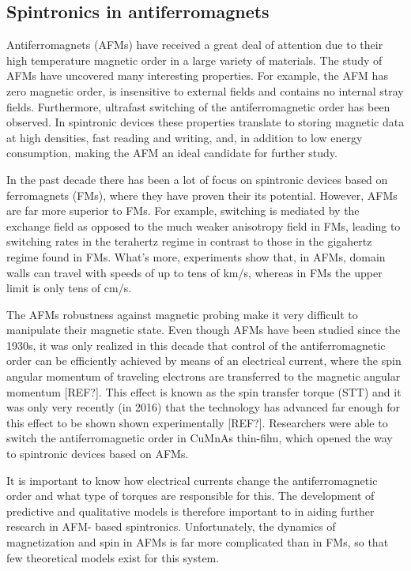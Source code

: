 \subsection{Spintronics in antiferromagnets}
Antiferromagnets (AFMs) have received a great deal of attention due to their high temperature magnetic order in a large variety of materials. The study of
AFMs have uncovered many interesting properties. For example, the AFM has zero magnetic order, is
insensitive to external fields and contains no internal stray fields.
Furthermore, ultrafast switching of the antiferromagnetic order has been observed. In
spintronic devices these properties translate to storing magnetic data at high densities, fast
reading and writing, and, in addition to low energy consumption, making the AFM an ideal
candidate for further study.

In the past decade there has been a lot of focus on spintronic devices based on
ferromagnets (FMs), where they have proven their its potential. However,
AFMs are far more superior to FMs. For example, switching is mediated by the
exchange field as opposed to the much weaker anisotropy field in FMs, leading to
switching rates in the terahertz regime in contrast to those in the gigahertz regime found in
FMs. What’s more, experiments show that, in
AFMs, domain walls can travel with speeds of up to tens of km/s, whereas in FMs
the upper limit is only tens of cm/s.

The AFMs robustness against magnetic probing make it very difficult to manipulate their
magnetic state. Even though AFMs have been studied since the 1930s, it was only
realized in this decade that control of the antiferromagnetic order can be efficiently 
achieved by means of an electrical current, where the spin angular momentum of traveling
electrons are transferred to the magnetic angular momentum [REF?]. This effect is
known as the spin transfer torque (STT) and it was only very recently (in 2016) that the
technology has advanced far enough for this effect to be shown shown experimentally
[REF?]. Researchers were able to switch the antiferromagnetic order in CuMnAs thin-film,
which opened the way to spintronic devices based on AFMs.

It is important to know how electrical currents change the antiferromagnetic order and what
type of torques are responsible for this. The development of predictive and qualitative models is therefore important to in aiding further research in AFM- based spintronics.
Unfortunately, the dynamics of magnetization and spin in AFMs is far more complicated
than in FMs, so that few theoretical models exist for this system.

